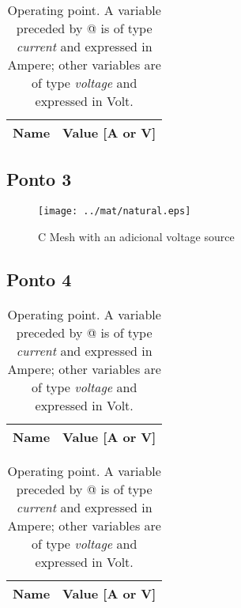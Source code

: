 \begin{table}[H]
  \centering
  \begin{tabular}{|l|r|}
    \hline    
    {\bf Name} & {\bf Value [A or V]} \\ \hline
    
  \end{tabular}
  \caption{Operating point. A variable preceded by @ is of type {\em current}
    and expressed in Ampere; other variables are of type {\it voltage} and expressed in
    Volt.}
  \label{tab:mat2b}
\end{table}

\subsection{Ponto 3}

\begin{figure}[H] \centering
\texttt{[image: ../mat/natural.eps]}
\caption{C Mesh with an adicional voltage source} %
\label{fig:mat3}
\end{figure}

\subsection{Ponto 4}

\begin{table}[H]
  \centering
  \begin{tabular}{|l|r|}
    \hline    
    {\bf Name} & {\bf Value [A or V]} \\ \hline
    
  \end{tabular}
  \caption{Operating point. A variable preceded by @ is of type {\em current}
    and expressed in Ampere; other variables are of type {\it voltage} and expressed in
    Volt.}
  \label{tab:mat4}
\end{table}

\begin{table}[H]
  \centering
  \begin{tabular}{|l|r|}
    \hline    
    {\bf Name} & {\bf Value [A or V]} \\ \hline
    
  \end{tabular}
  \caption{Operating point. A variable preceded by @ is of type {\em current}
    and expressed in Ampere; other variables are of type {\it voltage} and expressed in
    Volt.}
  \label{tab:mat4a}
\end{table}



